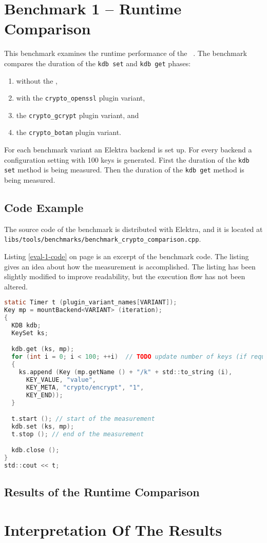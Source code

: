 
\section{Benchmark 1 -- Runtime Comparison}

This benchmark examines the runtime performance of the \crypto ~.
The benchmark compares the duration of the \texttt{kdb set} and \texttt{kdb get} phases:

\begin{enumerate}
\item without the \crypto ,
\item with the \texttt{crypto\_openssl} plugin variant,
\item the \texttt{crypto\_gcrypt} plugin variant, and 
\item the \texttt{crypto\_botan} plugin variant.
\end{enumerate}

For each benchmark variant an Elektra backend is set up.
For every backend a configuration setting with 100 keys  is generated.
First the duration of the \texttt{kdb set} method is being measured.
Then the duration of the \texttt{kdb get} method is being measured.

  \subsection{Code Example}

The source code of the benchmark is distributed with Elektra, and it is located at\\
\texttt{libs/tools/benchmarks/benchmark\_crypto\_comparison.cpp}.

Listing \ref{eval-1-code} on page \pageref{eval-1-code} is an excerpt of the benchmark code.
The listing gives an idea about how the measurement is accomplished.
The listing has been slightly modified to improve readability, but the execution flow has not been altered.

\begin{lstlisting}[label=eval-1-code,language=C,caption={Excerpt of Benchmark 1}]
static Timer t (plugin_variant_names[VARIANT]);
Key mp = mountBackend<VARIANT> (iteration);
{
  KDB kdb;
  KeySet ks;

  kdb.get (ks, mp);
  for (int i = 0; i < 100; ++i)  // TODO update number of keys (if required)!
  {
    ks.append (Key (mp.getName () + "/k" + std::to_string (i),
      KEY_VALUE, "value",
      KEY_META, "crypto/encrypt", "1",
      KEY_END));
  }

  t.start (); // start of the measurement
  kdb.set (ks, mp);
  t.stop (); // end of the measurement

  kdb.close ();
}
std::cout << t;
\end{lstlisting}

  \subsection{Results of the Runtime Comparison}




\section{Interpretation Of The Results}



